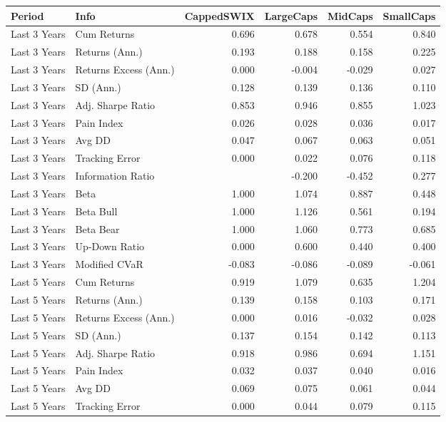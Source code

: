 \documentclass[11pt,preprint]{elsarticle}
\let\origtable\table
\let\endorigtable\endtable
\renewenvironment{table}[1][2] {
    \expandafter\origtable\expandafter[H]
} {
    \endorigtable
}
\numberwithin{equation}{section}
\numberwithin{figure}{section}
\numberwithin{table}{section}
\begin{document}
\begin{table}[H]
\centering
\begingroup\footnotesize
\begin{tabular}{llrrrr}
  \hline
Period & Info & CappedSWIX & LargeCaps & MidCaps & SmallCaps \\ 
  \hline
Last 3 Years & Cum Returns & 0.696 & 0.678 & 0.554 & 0.840 \\ 
  Last 3 Years & Returns (Ann.) & 0.193 & 0.188 & 0.158 & 0.225 \\ 
  Last 3 Years & Returns Excess (Ann.) & 0.000 & -0.004 & -0.029 & 0.027 \\ 
  Last 3 Years & SD (Ann.) & 0.128 & 0.139 & 0.136 & 0.110 \\ 
  Last 3 Years & Adj. Sharpe Ratio & 0.853 & 0.946 & 0.855 & 1.023 \\ 
  Last 3 Years & Pain Index & 0.026 & 0.028 & 0.036 & 0.017 \\ 
  Last 3 Years & Avg DD & 0.047 & 0.067 & 0.063 & 0.051 \\ 
  Last 3 Years & Tracking Error & 0.000 & 0.022 & 0.076 & 0.118 \\ 
  Last 3 Years & Information Ratio &  & -0.200 & -0.452 & 0.277 \\ 
  Last 3 Years & Beta & 1.000 & 1.074 & 0.887 & 0.448 \\ 
  Last 3 Years & Beta Bull & 1.000 & 1.126 & 0.561 & 0.194 \\ 
  Last 3 Years & Beta Bear & 1.000 & 1.060 & 0.773 & 0.685 \\ 
  Last 3 Years & Up-Down Ratio & 0.000 & 0.600 & 0.440 & 0.400 \\ 
  Last 3 Years & Modified CVaR & -0.083 & -0.086 & -0.089 & -0.061 \\ 
  Last 5 Years & Cum Returns & 0.919 & 1.079 & 0.635 & 1.204 \\ 
  Last 5 Years & Returns (Ann.) & 0.139 & 0.158 & 0.103 & 0.171 \\ 
  Last 5 Years & Returns Excess (Ann.) & 0.000 & 0.016 & -0.032 & 0.028 \\ 
  Last 5 Years & SD (Ann.) & 0.137 & 0.154 & 0.142 & 0.113 \\ 
  Last 5 Years & Adj. Sharpe Ratio & 0.918 & 0.986 & 0.694 & 1.151 \\ 
  Last 5 Years & Pain Index & 0.032 & 0.037 & 0.040 & 0.016 \\ 
  Last 5 Years & Avg DD & 0.069 & 0.075 & 0.061 & 0.044 \\ 
  Last 5 Years & Tracking Error & 0.000 & 0.044 & 0.079 & 0.115 \\ 

\end{tabular}
\end{table}
\end{document}
